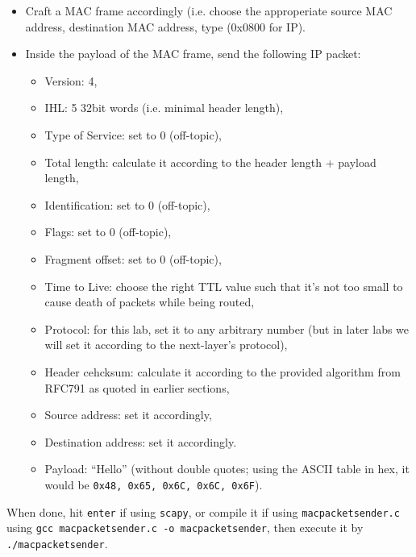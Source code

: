 \documentclass[pdftex,12pt,a4paper]{article}
\begin{document}
            \begin{itemize}
                \item Craft a MAC frame accordingly (i.e. choose the
                    approperiate source MAC address, destination MAC address,
                    type (0x0800 for IP).
                \item Inside the payload of the MAC frame, send the following
                    IP packet:
                \begin{itemize}
                    \item Version: 4,
                    \item IHL: 5 32bit words (i.e. minimal header length),
                    \item Type of Service: set to 0 (off-topic),
                    \item Total length: calculate it according to the header length
                        + payload length,
                    \item Identification: set to 0 (off-topic),
                    \item Flags: set to 0 (off-topic),
                    \item Fragment offset: set to 0 (off-topic),
                    \item Time to Live: choose the right TTL value such that it's
                        not too small to cause death of packets while being routed,
                    \item Protocol: for this lab, set it to any arbitrary number
                        (but in later labs we will set it according to the
                        next-layer's protocol),
                    \item Header cehcksum: calculate it according to the provided
                        algorithm from RFC791 as quoted in earlier sections,
                    \item Source address: set it accordingly,
                    \item Destination address: set it accordingly.
                    \item Payload: ``Hello'' (without double quotes; using
                        the ASCII table in hex, it would be \texttt{0x48, 0x65,
                        0x6C, 0x6C, 0x6F}).
                \end{itemize}
            \end{itemize}

            When done, hit \texttt{enter} if using \texttt{scapy}, or compile
            it if using \texttt{macpacketsender.c} using \texttt{gcc
            macpacketsender.c -o macpacketsender}, then execute it by
            \texttt{./macpacketsender}.
\end{document}
